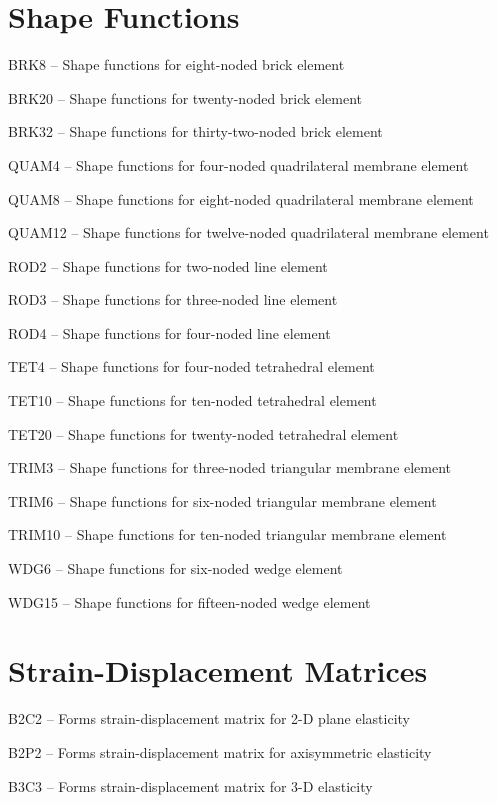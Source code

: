 \section{Shape Functions}
\begin{list}{}{\leftmargin=57pt }
\item[BRK8 \hfill]   -- Shape functions for eight-noded brick element
\item[BRK20 \hfill]  -- Shape functions for twenty-noded brick element
\item[BRK32 \hfill]  -- Shape functions for thirty-two-noded brick element
\item[QUAM4 \hfill]  -- Shape functions for four-noded quadrilateral membrane element
\item[QUAM8 \hfill]  -- Shape functions for eight-noded quadrilateral membrane element
\item[QUAM12 \hfill] -- Shape functions for twelve-noded quadrilateral membrane element
\item[ROD2 \hfill]   -- Shape functions for two-noded line element
\item[ROD3 \hfill]   -- Shape functions for three-noded line element
\item[ROD4 \hfill]   -- Shape functions for four-noded line element
\item[TET4 \hfill]   -- Shape functions for four-noded tetrahedral element
\item[TET10 \hfill]  -- Shape functions for ten-noded tetrahedral element
\item[TET20 \hfill]  -- Shape functions for twenty-noded tetrahedral element
\item[TRIM3 \hfill]  -- Shape functions for three-noded triangular membrane element
\item[TRIM6 \hfill]  -- Shape functions for six-noded triangular membrane element
\item[TRIM10 \hfill] -- Shape functions for ten-noded triangular membrane element
\item[WDG6 \hfill]   -- Shape functions for six-noded wedge element
\item[WDG15 \hfill]  -- Shape functions for fifteen-noded wedge element
\end{list}
\section{Strain-Displacement Matrices}
\begin{list}{}{\leftmargin=57pt }
\item[B2C2 \hfill]   -- Forms strain-displacement matrix for 2-D plane elasticity
\item[B2P2 \hfill]   -- Forms strain-displacement matrix for axisymmetric elasticity
\item[B3C3 \hfill]   -- Forms strain-displacement matrix for 3-D elasticity
\end{list}
